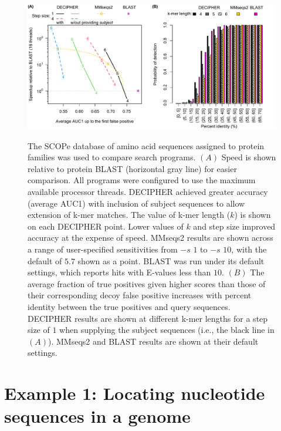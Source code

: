 \begin{figure}
\includegraphics[width=1\linewidth,alt={}]{figures/Fig3} \caption{The SCOPe database of amino acid sequences assigned to protein families was used to compare search programs. $(A)$ Speed is shown relative to protein BLAST (horizontal gray line) for easier comparison. All programs were configured to use the maximum available processor threads. DECIPHER achieved greater accuracy (average AUC1) with inclusion of subject sequences to allow extension of k-mer matches. The value of k-mer length ($k$) is shown on each DECIPHER point. Lower values of $k$ and step size improved accuracy at the expense of speed. MMseqs2 results are shown across a range of user-specified sensitivities from $-s$ $1$ to $-s$ $10$, with the default of $5.7$ shown as a point. BLAST was run under its default settings, which reports hits with E-values less than $10$. $(B)$ The average fraction of true positives given higher scores than those of their corresponding decoy false positive increases with percent identity between the true positives and query sequences. DECIPHER results are shown at different k-mer lengths for a step size of $1$ when supplying the subject sequences (i.e., the black line in $(A)$). MMseqs2 and BLAST results are shown at their default settings.}\label{fig:fig3}
\end{figure}

\section{Example 1: Locating nucleotide sequences in a genome}\label{example-1-locating-nucleotide-sequences-in-a-genome}

